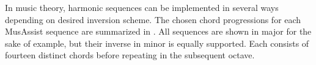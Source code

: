\documentclass{article}
\newlength{\maxcollen}
\begin{document}
In music theory, harmonic sequences can be implemented in several ways depending on desired inversion scheme. 
The chosen chord progressions for each MusAssist sequence are summarized in .
All sequences are shown in major for the sake of example, but their inverse in minor is equally supported. 
Each consists of fourteen distinct chords before repeating in the subsequent octave. 


\begin{table}[h!]

  \begin{center}
\end{center}
\end{table}
\end{document}
